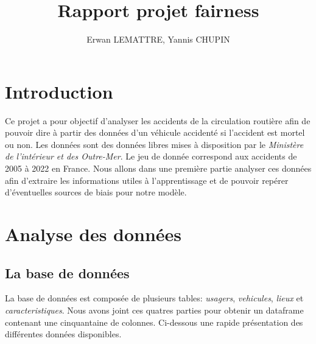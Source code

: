 \documentclass[]{article}
\author{Erwan LEMATTRE, Yannis CHUPIN}
\title{Rapport projet fairness}
\begin{document}
    \tableofcontents
    \newpage

    \section{Introduction}
    Ce projet a pour objectif d'analyser les accidents de la circulation routière afin de pouvoir dire 
    à partir des données d'un véhicule accidenté si l'accident est mortel ou non.
    Les données sont des données libres mises à disposition par le \textit{Ministère de l'intérieur et des 
    Outre-Mer}. Le jeu de donnée correspond aux accidents de 2005 à 2022 en France. Nous allons dans une première 
    partie analyser ces données afin d'extraire les informations utiles à l'apprentissage et de pouvoir repérer 
    d'éventuelles sources de biais pour notre modèle.

    \section{Analyse des données}
    \subsection{La base de données}
    La base de données est composée de plusieurs tables: \textit{usagers}, \textit{vehicules}, \textit{lieux} et 
    \textit{caracteristiques}. Nous avons joint ces quatres parties pour obtenir un dataframe contenant une 
    cinquantaine de colonnes. 
    Ci-dessous une rapide présentation des différentes données disponibles.
\end{document}
